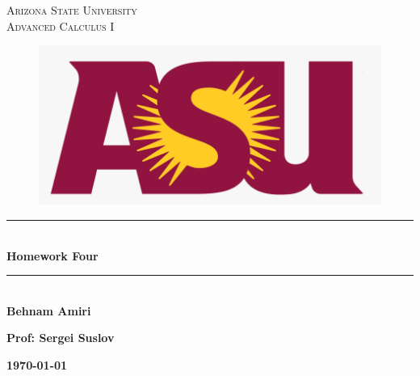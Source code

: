 \documentclass[fleqn]{article}
\begin{document}
  \begin{titlepage}

    \newcommand{\HRule}{\rule{\linewidth}{0.5mm}}

    \center


    \textsc{\LARGE Arizona State University}\\[1.5cm]

    \textsc{\LARGE Advanced Calculus I }\\[1.5cm]


    \begin{figure}
      \includegraphics[width=\linewidth]{asu.png}
    \end{figure}


    \HRule \\[0.4cm]
    { \huge \bfseries Homework Four }\\[0.4cm] 
    \HRule \\[1.5cm]

    \textbf{Behnam Amiri}

    \bigbreak

    \textbf{Prof: Sergei Suslov}

    \bigbreak


    \textbf{{\large \today}\\[2cm]}

    \vfill

  \end{titlepage}
\end{document}
